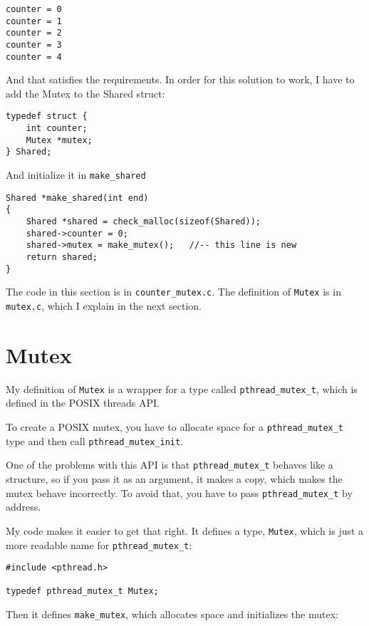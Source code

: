 \documentclass[12pt]{book}
\begin{document}
\begin{verbatim}
counter = 0
counter = 1
counter = 2
counter = 3
counter = 4
\end{verbatim}

And that satisfies the requirements.  In order for this solution to
work, I have to add the Mutex to the Shared struct:

\begin{verbatim}
typedef struct {
    int counter;
    Mutex *mutex;
} Shared;
\end{verbatim}

And initialize it in \verb"make_shared"

\begin{verbatim}
Shared *make_shared(int end)
{
    Shared *shared = check_malloc(sizeof(Shared));
    shared->counter = 0;
    shared->mutex = make_mutex();   //-- this line is new
    return shared;
}
\end{verbatim}

The code in this section is in \verb"counter_mutex.c".
The definition of {\tt Mutex} is in {\tt mutex.c}, which I
explain in the next section.



\section{Mutex}

My definition of {\tt Mutex} is a wrapper for a type called
\verb"pthread_mutex_t", which is defined in the POSIX threads API.

To create a POSIX mutex, you have to allocate space for a
\verb"pthread_mutex_t" type and then call \verb"pthread_mutex_init".

One of the problems with this API is that \verb"pthread_mutex_t"
behaves like a structure, so if you pass it as an argument, it makes a
copy, which makes the mutex behave incorrectly.  To avoid that, you have to
pass \verb"pthread_mutex_t" by address.

My code makes it easier to get that right.  It defines a
type, {\tt Mutex}, which is just a more readable name for
\verb"pthread_mutex_t":

\begin{verbatim}
#include <pthread.h>

typedef pthread_mutex_t Mutex;
\end{verbatim}

Then it defines \verb"make_mutex", which allocates space and
initializes the mutex:
\end{document}
